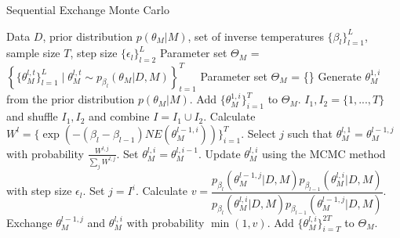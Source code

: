\documentclass[12pt]{article}
\begin{document}
\begin{algorithm}[h]
  \caption{Sequential Exchange Monte Carlo}
  \label{SEMC}
  \begin{algorithmic}[1]
    \REQUIRE Data $D$, prior distribution $p(\theta_M|M)$, set of inverse temperatures $\{\beta_l\}_{l = 1}^L$, sample size $T$, step size $\{\epsilon_l\}_{l = 2}^L$
    \ENSURE Parameter set $\Theta_M$ = $\left\{\{\theta_M^{l,t}\}_{l = 1}^L \mid \theta_M^{l,t} \sim p_{\beta_l}(\theta_M|D,M)\right\}_{t = 1}^{T}$
    \STATE Parameter set $\Theta_M$ = \{\}
        \STATE Generate $\theta_M^{1,i}$ from the prior distribution $p(\theta_M|M)$.
    \ENDFOR
    \STATE Add $\{\theta_M^{1,i}\}_{i=1}^T$ to $\Theta_M$.
        \STATE $I_1, I_2 = \{1,...,T\}$ and shuffle $I_1, I_2$ and combine $I = I_1 \cup I_2$.
                \STATE Calculate $W^l = \{ \exp(-(\beta_{l} - \beta_{l-1})NE(\theta_M^{l-1,i}))\}_{i=1}^{T}$.
                \STATE Select $j$ such that $\theta_M^{l,1} = \theta_M^{l-1,j}$ with probability $\frac{W^{l,j}}{\sum_j W^{l,j}}$.
            \ELSE
                \STATE Set $\theta_M^{l,i} = \theta_M^{l,i-1}$.
            \ENDIF
            \STATE Update $\theta_M^{l,i}$ using the MCMC method with step size $\epsilon_l$.
            \STATE Set $j = I^i$.
            \STATE Calculate $v = \dfrac{p_{\beta_{l}}(\theta_M^{l-1,j}|D,M)p_{\beta_{l-1}}(\theta_M^{l,i}|D,M)}{p_{\beta_{l}}(\theta_M^{l,i}|D,M)p_{\beta_{l-1}}(\theta_M^{l-1,j}|D,M)}$.
            \STATE Exchange $\theta_M^{l-1,j}$ and $\theta_M^{l,i}$ with probability $\min(1,v)$.
        \ENDFOR
        \STATE Add $\{\theta_M^{l,i}\}_{i=T}^{2T}$ to $\Theta_M$.
    \ENDFOR
  \end{algorithmic}
\end{algorithm}
\end{document}

